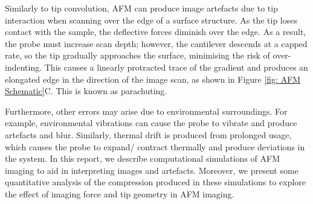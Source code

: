 Similarly to tip convolution, AFM can produce image artefacts due to tip interaction when scanning over the edge of a surface structure. As the tip loses contact with the sample, the deflective forces diminish over the edge. As a result, the probe must increase scan depth; however, the cantilever descends at a capped rate, so the tip gradually approaches the surface, minimising the risk of over-indenting. This causes a linearly protracted trace of the gradient and produces an elongated edge in the direction of the image scan, as shown in Figure \ref{fig: AFM Schematic}C. This is known as parachuting.

Furthermore, other errors may arise due to environmental surroundings. For example, environmental vibrations can cause the probe to vibrate and produce artefacts and blur. Similarly, thermal drift is produced from prolonged usage, which causes the probe to expand/ contract thermally and produce deviations in the system. In this report, we describe computational simulations of AFM imaging to aid in interpreting images and artefacts. Moreover, we present some quantitative analysis of the compression produced in these simulations to explore the effect of imaging force and tip geometry in AFM imaging.

